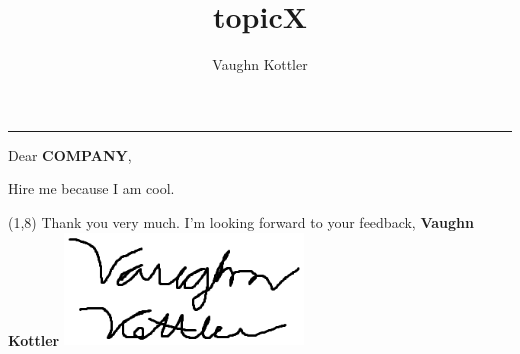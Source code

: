 \documentclass[letterpaper,12pt]{article}
\title{topicX}
\author{Vaughn Kottler}
\begin{document}
{\centering\noindent\rule{7.75in}{0.5pt}}\break\break
Dear {\color{maroon}\textbf{COMPANY}},

\noindent\break
Hire me because I am cool.

{\begin{textblock}{8}(1,8)\noindent
Thank you very much. I'm looking forward to your feedback,\break\break
{\color{maroon}\textbf{Vaughn Kottler}}\break\break\break
\includegraphics[width=2.5in,natwidth=315,natheight=148]{signature.png}
\end{textblock}}
\end{document}
